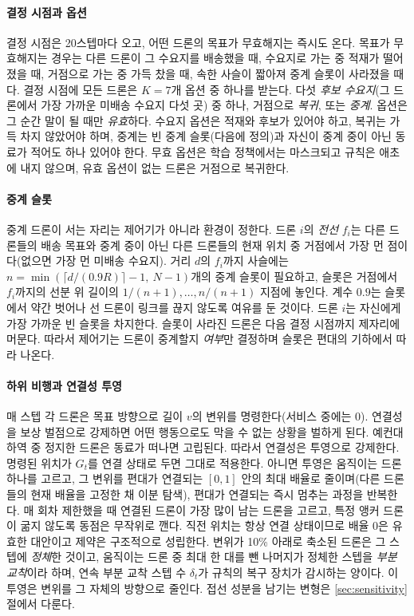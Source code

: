 \documentclass[final,5p,times,twocolumn]{elsarticle}
\begin{document}
\paragraph{결정 시점과 옵션}
결정 시점은 20스텝마다 오고, 어떤 드론의 목표가 무효해지는 즉시도 온다. 목표가 무효해지는 경우는
다른 드론이 그 수요지를 배송했을 때, 수요지로 가는 중 적재가 떨어졌을 때, 거점으로 가는 중 가득
찼을 때, 속한 사슬이 짧아져 중계 슬롯이 사라졌을 때다. 결정 시점에 모든 드론은 $K = 7$개 옵션 중
하나를 받는다. 다섯 \emph{후보 수요지}(그 드론에서 가장 가까운 미배송 수요지 다섯 곳) 중 하나,
거점으로 \emph{복귀}, 또는 \emph{중계}. 옵션은 그 순간 말이 될 때만 \emph{유효}하다. 수요지 옵션은
적재와 후보가 있어야 하고, 복귀는 가득 차지 않았어야 하며, 중계는 빈 중계 슬롯(다음에 정의)과
자신이 중계 중이 아닌 동료가 적어도 하나 있어야 한다. 무효 옵션은 학습 정책에서는 마스크되고
규칙은 애초에 내지 않으며, 유효 옵션이 없는 드론은 거점으로 복귀한다.

\paragraph{중계 슬롯}
중계 드론이 서는 자리는 제어기가 아니라 환경이 정한다. 드론 $i$의 \emph{전선} $f_i$는 다른
드론들의 배송 목표와 중계 중이 아닌 다른 드론들의 현재 위치 중 거점에서 가장 먼 점이다(없으면 가장
먼 미배송 수요지). 거리 $d$의 $f_i$까지 사슬에는 $n = \min(\lceil d/(0.9R) \rceil - 1,\ N-1)$개의
중계 슬롯이 필요하고, 슬롯은 거점에서 $f_i$까지의 선분 위 길이의 $1/(n+1), \dots, n/(n+1)$
지점에 놓인다. 계수 $0.9$는 슬롯에서 약간 벗어나 선 드론이 링크를 끊지 않도록 여유를 둔 것이다.
드론 $i$는 자신에게 가장 가까운 빈 슬롯을 차지한다. 슬롯이 사라진 드론은 다음 결정 시점까지 제자리에
머문다. 따라서 제어기는 드론이 중계할지 \emph{여부}만 결정하며 슬롯은 편대의 기하에서 따라 나온다.

\paragraph{하위 비행과 연결성 투영}
매 스텝 각 드론은 목표 방향으로 길이 $v$의 변위를 명령한다(서비스 중에는 0). 연결성을 보상
벌점으로 강제하면 어떤 행동으로도 막을 수 없는 상황을 벌하게 된다. 예컨대 하역 중 정지한 드론은
동료가 떠나면 고립된다. 따라서 연결성은 투영으로 강제한다. 명령된 위치가 $G_t$를 연결 상태로
두면 그대로 적용한다. 아니면 투영은 움직이는 드론 하나를 고르고, 그 변위를 편대가 연결되는 $[0,1]$
안의 최대 배율로 줄이며(다른 드론들의 현재 배율을 고정한 채 이분 탐색), 편대가 연결되는 즉시
멈추는 과정을 반복한다. 매 회차 제한했을 때 연결된 드론이 가장 많이 남는 드론을 고르고, 특정 앵커
드론이 굶지 않도록 동점은 무작위로 깬다. 직전 위치는 항상 연결 상태이므로 배율 0은 유효한 대안이고
제약은 구조적으로 성립한다. 변위가 10\% 아래로 축소된 드론은 그 스텝에 \emph{정체}한 것이고,
움직이는 드론 중 최대 한 대를 뺀 나머지가 정체한 스텝을 \emph{부분 교착}이라 하며, 연속 부분 교착
스텝 수 $\delta_t$가 규칙의 복구 장치가 감시하는 양이다. 이 투영은 변위를 그 자체의 방향으로
줄인다. 접선 성분을 남기는 변형은 \ref{sec:sensitivity}절에서 다룬다.
\end{document}
